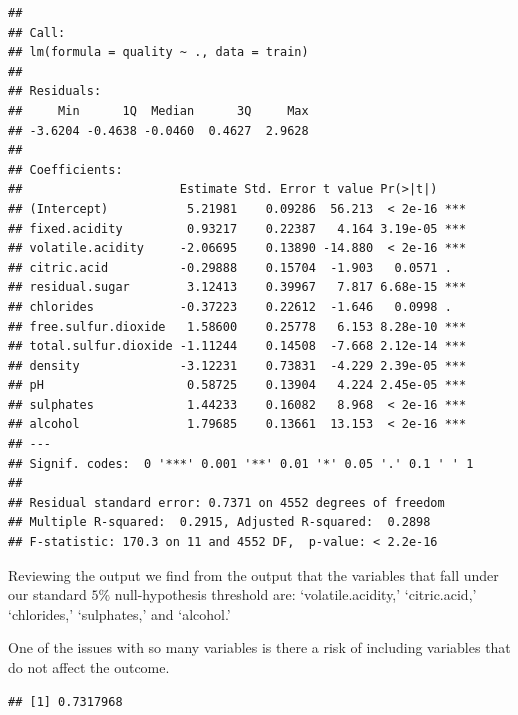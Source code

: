 \documentclass[
]{book}
\newenvironment{Shaded}{\begin{snugshade}}{\end{snugshade}}
\newcommand{\AttributeTok}[1]{\textcolor[rgb]{0.77,0.63,0.00}{#1}}
\newcommand{\FloatTok}[1]{\textcolor[rgb]{0.00,0.00,0.81}{#1}}
\newcommand{\FunctionTok}[1]{\textcolor[rgb]{0.00,0.00,0.00}{#1}}
\newcommand{\NormalTok}[1]{#1}
\newcommand{\OtherTok}[1]{\textcolor[rgb]{0.56,0.35,0.01}{#1}}
\newcommand{\SpecialCharTok}[1]{\textcolor[rgb]{0.00,0.00,0.00}{#1}}
\begin{document}
\begin{verbatim}
## 
## Call:
## lm(formula = quality ~ ., data = train)
## 
## Residuals:
##     Min      1Q  Median      3Q     Max 
## -3.6204 -0.4638 -0.0460  0.4627  2.9628 
## 
## Coefficients:
##                      Estimate Std. Error t value Pr(>|t|)    
## (Intercept)           5.21981    0.09286  56.213  < 2e-16 ***
## fixed.acidity         0.93217    0.22387   4.164 3.19e-05 ***
## volatile.acidity     -2.06695    0.13890 -14.880  < 2e-16 ***
## citric.acid          -0.29888    0.15704  -1.903   0.0571 .  
## residual.sugar        3.12413    0.39967   7.817 6.68e-15 ***
## chlorides            -0.37223    0.22612  -1.646   0.0998 .  
## free.sulfur.dioxide   1.58600    0.25778   6.153 8.28e-10 ***
## total.sulfur.dioxide -1.11244    0.14508  -7.668 2.12e-14 ***
## density              -3.12231    0.73831  -4.229 2.39e-05 ***
## pH                    0.58725    0.13904   4.224 2.45e-05 ***
## sulphates             1.44233    0.16082   8.968  < 2e-16 ***
## alcohol               1.79685    0.13661  13.153  < 2e-16 ***
## ---
## Signif. codes:  0 '***' 0.001 '**' 0.01 '*' 0.05 '.' 0.1 ' ' 1
## 
## Residual standard error: 0.7371 on 4552 degrees of freedom
## Multiple R-squared:  0.2915, Adjusted R-squared:  0.2898 
## F-statistic: 170.3 on 11 and 4552 DF,  p-value: < 2.2e-16
\end{verbatim}

Reviewing the output we find from the output that the variables that fall under our standard \(5\%\) null-hypothesis threshold are: `volatile.acidity,' `citric.acid,' `chlorides,' `sulphates,' and `alcohol.'

One of the issues with so many variables is there a risk of including variables that do not affect the outcome.

\begin{Shaded}
\end{Shaded}

\begin{verbatim}
## [1] 0.7317968
\end{verbatim}
\end{document}
